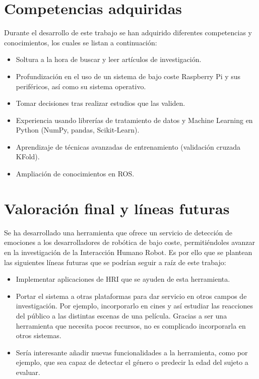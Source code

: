 \section{Competencias adquiridas}

Durante el desarrollo de este trabajo se han adquirido diferentes competencias y conocimientos, los cuales se listan a continuación:

\begin{itemize}
    \item Soltura a la hora de buscar y leer artículos de investigación.
    
    \item Profundización en el uso de un sistema de bajo coste Raspberry Pi y sus periféricos, así como su sistema operativo.
    
    \item Tomar decisiones tras realizar estudios que las validen.
    
    \item Experiencia usando librerías de tratamiento de datos y Machine Learning en Python (NumPy, pandas, Scikit-Learn).
    
    \item Aprendizaje de técnicas avanzadas de entrenamiento (validación cruzada KFold).
    
    \item Ampliación de conocimientos en ROS.
\end{itemize}

\section{Valoración final y líneas futuras}

Se ha desarrollado una herramienta que ofrece un servicio de detección de emociones a los desarrolladores de robótica de bajo coste, permitiéndoles avanzar en la investigación de la Interacción Humano Robot. Es por ello que se plantean las siguientes líneas futuras que se podrían seguir a raíz de este trabajo:

\begin{itemize}
    \item Implementar aplicaciones de HRI que se ayuden de esta herramienta.
    
    \item Portar el sistema a otras plataformas para dar servicio en otros campos de investigación. Por ejemplo, incorporarlo en cines y así estudiar las reacciones del público a las distintas escenas de una película. Gracias a ser una herramienta que necesita pocos recursos, no es complicado incorporarla en otros sistemas.
    
    \item Sería interesante añadir nuevas funcionalidades a la herramienta, como por ejemplo, que sea capaz de detectar el género o predecir la edad del sujeto a evaluar.
\end{itemize}

